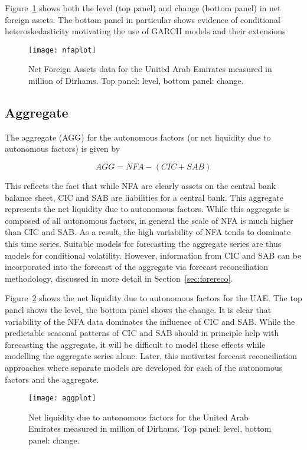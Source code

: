 Figure~\ref{fig:nfadata} shows both  the level (top panel)  and change (bottom
panel) in net foreign assets. The bottom panel in particular shows evidence of
conditional heteroskedasticity  motivating the use  of GARCH models  and their
extensions

\begin{figure}[!h] \centering \texttt{[image: nfaplot]}
    \caption{Net Foreign Assets data for  the United Arab Emirates measured in
million of Dirhams. Top panel: level, bottom panel: change.}
    \label{fig:nfadata}
\end{figure}

\subsection{Aggregate}

The  aggregate (AGG)  for  the autonomous  factors (or  net  liquidity due  to
autonomous factors) is given by

\[ AGG=NFA-(CIC+SAB)
\]

This reflects the fact  that while NFA are clearly assets  on the central bank
balance sheet, CIC and SAB are  liabilities for a central bank. This aggregate
represents the net liquidity due  to autonomous factors.  While this aggregate
is composed  of all autonomous  factors, in general the  scale of NFA  is much
higher than  CIC and SAB. As  a result, the  high variability of NFA  tends to
dominate  this time  series.  Suitable  models for  forecasting the  aggregate
series are thus models for  conditional volatility.  However, information from
CIC  and SAB  can  be incorporated  into  the forecast  of  the aggregate  via
forecast   reconciliation   methodology,   discussed   in   more   detail   in
Section~\ref{sec:forereco}.

Figure~\ref{fig:aggdata} shows the net liquidity due to autonomous factors for
the UAE. The top panel shows the  level, the bottom panel shows the change. It
is clear that variability  of the NFA data dominates the  influence of CIC and
SAB.  While  the predictable  seasonal  patterns  of  CIC  and SAB  should  in
principle help with  forecasting the aggregate, it will be  difficult to model
these  effects  while  modelling  the  aggregate  series  alone.  Later,  this
motivates  forecast  reconciliation  approaches   where  separate  models  are
developed for each of the autonomous factors and the aggregate.

\begin{figure}[!h]
    \centering
    \texttt{[image: aggplot]}
    \caption{Net liquidity due to autonomous factors for the United Arab Emirates measured in million of Dirhams. Top panel: level, bottom panel: change.}
    \label{fig:aggdata}
\end{figure}
